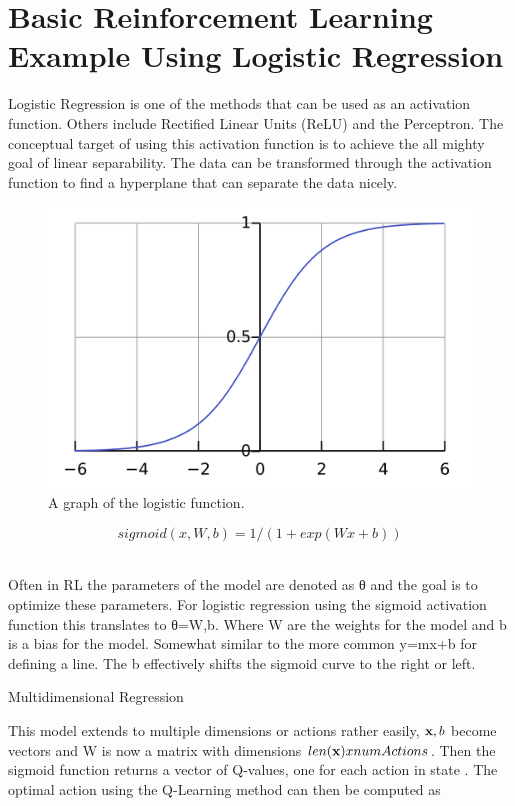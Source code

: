 
\chapter{Basic Reinforcement Learning Example Using Logistic Regression }
\label{chapter:logistic-regression}

Logistic Regression is one of the methods that can be used as an activation function. Others include Rectified Linear Units (ReLU) and the Perceptron. The conceptual target of using this activation function is to achieve the all mighty goal of linear separability. The data can be transformed through the activation function to find a hyperplane that can separate the data nicely. 

\begin{figure}
	\label{figure:logistic-function}
	\includegraphics[width=0.95\linewidth]{../images/Logistic-curve.png}
	\caption{A graph of the logistic function.}
\end{figure}

\begin{equation}
	sigmoid(x,W,b)=1/(1+exp(Wx+b))
\end{equation}  



Often in RL the parameters of the model are denoted as θ and the goal is to optimize these parameters. For logistic regression using the sigmoid activation function this translates to θ={W,b}. Where W are the weights for the model and b is a bias for the model. Somewhat similar to the more common y=mx+b for defining a line. The b effectively shifts the sigmoid curve to the right or left.

Multidimensional Regression

This model extends to multiple dimensions or actions rather easily, $\textbf{x}, b$ become vectors and W is now a matrix with dimensions $len(\textbf{x}) x numActions$. Then the sigmoid function returns a vector of Q-values, one for each action in state . The optimal action using the Q-Learning method can then be computed as

